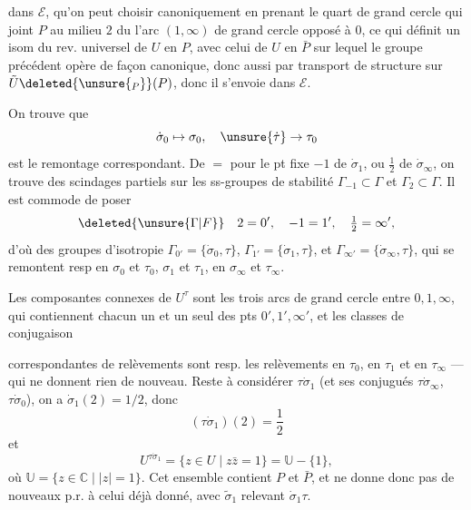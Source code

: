 
dans $\mathcal E$, qu'on peut choisir canoniquement en prenant le quart de grand cercle qui joint $P$ au milieu $2$ du  l'arc $(1,\infty)$ de grand cercle opposé à $0$, ce qui définit un isom du rev. universel de $U$ en $P$, avec celui de $U$ en $\bar P$ sur lequel le groupe précédent opère de façon canonique, donc aussi par transport de structure sur $\tilde U\deleted{\unsure{_P}}(P)$, donc il s'envoie dans $\mathcal E$.

On trouve que
\[
\dot\sigma_0\mapsto\sigma_0,\quad\unsure{\dot\tau}\to\tau_0
\]
est le remontage correspondant. De $=$ pour le pt fixe $-1$ de $\dot\sigma_1$, ou $\frac12$ de $\dot\sigma_\infty$, on trouve des scindages partiels sur les ss-groupes de  stabilité $\Gamma_{-1}\subset\Gamma$ et $\Gamma_2\subset\Gamma$. Il est commode de poser
\[
\deleted{\unsure{\Gamma|F}}\quad 2=0',\quad -1=1',\quad \tfrac12=\infty',
\]
d'où des groupes d'isotropie $\Gamma_{0'}=\{\dot\sigma_0,\tau\}$, $\Gamma_{1'}=\{\dot\sigma_1,\tau\}$, et $\Gamma_{\infty'}=\{\dot\sigma_\infty,\tau\}$, qui se remontent resp en $\sigma_0$ et $\tau_0$,  $\sigma_1$ et $\tau_1$, en $\sigma_\infty$ et $\tau_\infty$.

Les composantes connexes de $U^\tau$ sont les trois arcs de grand cercle entre $0,1,\infty$, qui contiennent chacun un  et un seul des pts $0',1',\infty'$, et les classes de conjugaison

correspondantes de relèvements  sont resp. les relèvements en $\tau_0$, en $\tau_1$ et en $\tau_\infty$ --- qui ne donnent rien de nouveau. Reste à considérer $\tau\dot\sigma_1$ (et ses conjugués  $\tau\dot\sigma_\infty$, $\tau\dot\sigma_0$), on a $\dot\sigma_1(2)=1/2$, donc
\[
(\tau\dot\sigma_1)(2)=\frac12
\]
et
\[
U^{\tau\dot\sigma_1}=\{z\in U\mid z\bar z=1\}=\mathbb U-\{1\},
\]
où $\mathbb U=\{z\in\mathbb C\mid|z|=1\}$. Cet ensemble contient $P$ et $\bar P$, et ne donne donc pas de nouveaux  p.r. à celui déjà donné, avec $\tilde\sigma_1$ relevant $\dot\sigma_1\tau$.


